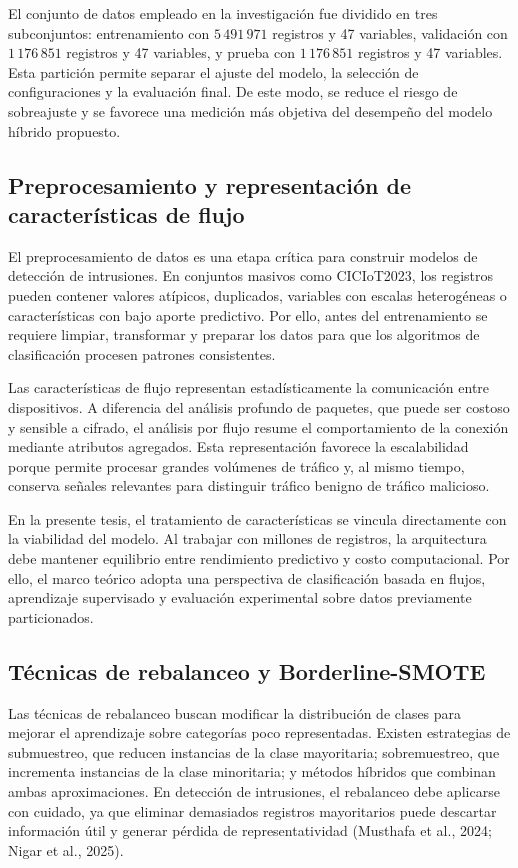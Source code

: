 \documentclass[12pt,a4paper]{article}
\begin{document}
El conjunto de datos empleado en la investigación fue dividido en tres subconjuntos: entrenamiento con $5\,491\,971$ registros y 47 variables, validación con $1\,176\,851$ registros y 47 variables, y prueba con $1\,176\,851$ registros y 47 variables. Esta partición permite separar el ajuste del modelo, la selección de configuraciones y la evaluación final. De este modo, se reduce el riesgo de sobreajuste y se favorece una medición más objetiva del desempeño del modelo híbrido propuesto.

\subsection{Preprocesamiento y representación de características de flujo}

El preprocesamiento de datos es una etapa crítica para construir modelos de detección de intrusiones. En conjuntos masivos como CICIoT2023, los registros pueden contener valores atípicos, duplicados, variables con escalas heterogéneas o características con bajo aporte predictivo. Por ello, antes del entrenamiento se requiere limpiar, transformar y preparar los datos para que los algoritmos de clasificación procesen patrones consistentes.

Las características de flujo representan estadísticamente la comunicación entre dispositivos. A diferencia del análisis profundo de paquetes, que puede ser costoso y sensible a cifrado, el análisis por flujo resume el comportamiento de la conexión mediante atributos agregados. Esta representación favorece la escalabilidad porque permite procesar grandes volúmenes de tráfico y, al mismo tiempo, conserva señales relevantes para distinguir tráfico benigno de tráfico malicioso.

En la presente tesis, el tratamiento de características se vincula directamente con la viabilidad del modelo. Al trabajar con millones de registros, la arquitectura debe mantener equilibrio entre rendimiento predictivo y costo computacional. Por ello, el marco teórico adopta una perspectiva de clasificación basada en flujos, aprendizaje supervisado y evaluación experimental sobre datos previamente particionados.

\subsection{Técnicas de rebalanceo y Borderline-SMOTE}

Las técnicas de rebalanceo buscan modificar la distribución de clases para mejorar el aprendizaje sobre categorías poco representadas. Existen estrategias de submuestreo, que reducen instancias de la clase mayoritaria; sobremuestreo, que incrementa instancias de la clase minoritaria; y métodos híbridos que combinan ambas aproximaciones. En detección de intrusiones, el rebalanceo debe aplicarse con cuidado, ya que eliminar demasiados registros mayoritarios puede descartar información útil y generar pérdida de representatividad (Musthafa et al., 2024; Nigar et al., 2025).
\end{document}
